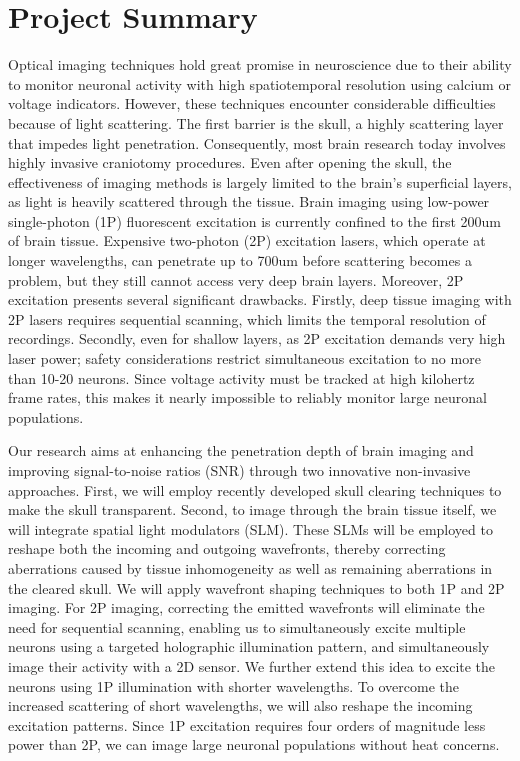 \section*{Project Summary}



Optical imaging techniques hold great promise in neuroscience due to their ability to monitor neuronal activity with high spatiotemporal resolution using calcium or voltage indicators. However, these techniques encounter considerable difficulties because of light scattering. The first barrier is the skull, a highly scattering layer that impedes light penetration. Consequently, most brain research today involves highly invasive craniotomy procedures. Even after opening the skull, the effectiveness of imaging methods is largely limited to the brain's superficial layers, as light is heavily scattered through the tissue.
Brain imaging using low-power single-photon (1P) fluorescent excitation is currently confined to the first 200um of brain tissue. Expensive two-photon (2P) excitation lasers, which operate at longer wavelengths, can penetrate up to 700um before scattering becomes a problem, but they still cannot access very deep brain layers. Moreover, 2P excitation presents several significant drawbacks. Firstly, deep tissue imaging with 2P lasers requires sequential scanning, which limits the temporal resolution of recordings. Secondly, even for shallow layers, as 2P excitation demands very high laser power; safety considerations restrict simultaneous excitation to no more than 10-20 neurons. Since voltage activity must be tracked at high kilohertz frame rates, this makes it nearly impossible to reliably monitor large neuronal populations.

Our research aims at  enhancing the penetration depth of brain imaging and improving signal-to-noise ratios (SNR) through two innovative non-invasive approaches.
First, we will employ recently developed skull clearing techniques to make the skull transparent.
 Second, to image through the brain tissue itself, we will integrate spatial light modulators (SLM). These SLMs will be employed to reshape both the incoming and outgoing wavefronts, thereby correcting aberrations caused by tissue inhomogeneity as well as remaining aberrations in the cleared skull. 
We will apply wavefront shaping techniques to both 1P and 2P imaging. For 2P imaging, correcting the emitted wavefronts will eliminate the need for sequential scanning, enabling us to simultaneously excite multiple neurons using a targeted holographic illumination pattern, and simultaneously image their activity with a 2D sensor.
We further extend this idea to excite the neurons using 1P illumination with shorter wavelengths. To overcome the increased scattering of short wavelengths, we will also reshape the incoming excitation patterns.
 Since 1P excitation requires four orders of magnitude less power than 2P, we can image large neuronal populations without heat concerns.

